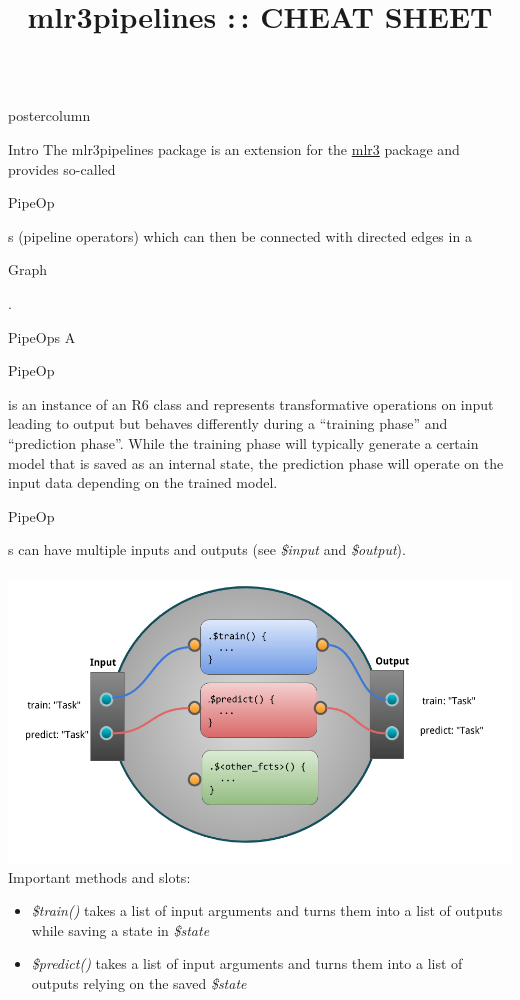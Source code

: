 \documentclass{beamer}
\title{mlr3pipelines :\,: CHEAT SHEET} %
\newlength{\columnheight} %
\newcommand{\codeinline}[1]{\begin{codeboxinline}#1\end{codeboxinline}}
\begin{document}
\begin{frame}[fragile]{}
	\begin{columns}
		\begin{column}{.245\textwidth}
			\begin{beamercolorbox}[center]{postercolumn}
				\begin{minipage}{.98\textwidth}
					\parbox[t][\columnheight]{\textwidth}{
						\begin{myblock}{Intro}
              The mlr3pipelines package is an extension for the \href{https://github.com/mlr-org/mlr3}{mlr3} package and provides so-called \codeinline{PipeOp}s (pipeline operators) which can then be connected with directed edges in a \codeinline{Graph}.
            \end{myblock}
						\begin{myblock}{PipeOps}
              A \codeinline{PipeOp} is an instance of an R6 class and represents transformative operations on input leading to output but behaves differently during a ``training phase'' and ``prediction phase''. While the training phase will typically generate a certain model that is saved as an internal state, the prediction phase will operate on the input data depending on the trained model. \codeinline{PipeOp}s can have multiple inputs and outputs (see \textit{\$input} and \textit{\$output}).
              \\
              \\
              \includegraphics[width=\textwidth]{img/po_viz.png}
              Important methods and slots:
              \begin{itemize}
                \item \textit{\$train()} takes a list of input arguments and turns them into a list of outputs while saving a state in \textit{\$state}
                \item \textit{\$predict()} takes a list of input arguments and turns them into a list of outputs relying on the saved \textit{\$state}

\end{itemize}
\end{myblock}}
\end{minipage}
\end{beamercolorbox}
\end{column}
\end{columns}
\end{frame}
\end{document}
